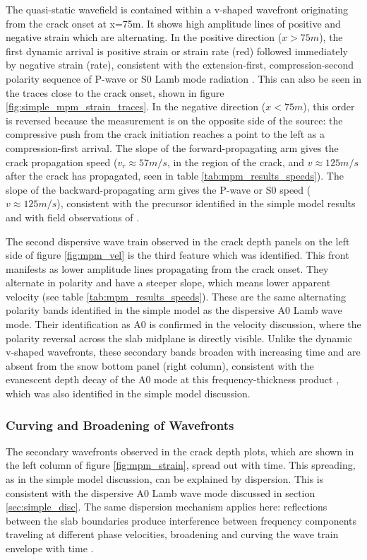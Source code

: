 The quasi-static wavefield is contained within a v-shaped wavefront originating from the crack onset at x=75m. It shows high amplitude lines of positive and negative strain which are alternating. In the positive
direction ($x > 75m$), the first dynamic arrival is positive strain or strain rate (red)
followed immediately by negative strain (rate), consistent with the
extension-first, compression-second polarity sequence of P-wave or S0 Lamb
mode radiation \parencite{kAkiRichards19801981}. This can also be seen in the traces close to the crack onset, shown in figure \ref{fig:simple_mpm_strain_traces}. In the negative direction
($x < 75m$), this order is reversed because the measurement is on the
opposite side of the source: the compressive push from the crack initiation
reaches a point to the left as a compression-first arrival. The slope
of the forward-propagating arm gives the crack propagation speed
($v_r \approx 57m/s$, in the region of the crack, and  $v \approx
125m/s$ after the crack has propagated, seen in table \ref{tab:mpm_results_speeds}). The slope of
the backward-propagating arm gives the P-wave or S0 speed ($v \approx
125m/s$), consistent with the precursor identified in the simple model
results and with field observations of \cite{herwijnenSeismicSensorArray2011}. \par

The second dispersive wave train observed in the crack depth panels on the left side of figure \ref{fig:mpm_vel} is the third feature which was identified. This front manifests as lower amplitude lines propagating from the crack onset. They alternate in polarity and have a steeper slope, which means lower apparent velocity (see table \ref{tab:mpm_results_speeds}). These are the same alternating polarity bands identified in the simple model as the dispersive A0 Lamb wave mode. Their identification as A0 is confirmed in the velocity discussion, where the polarity reversal across the slab midplane is directly visible. Unlike the dynamic v-shaped wavefronts, these secondary bands broaden with increasing time and are absent from the snow bottom panel (right column), consistent with the evanescent depth decay of the A0 mode at this frequency-thickness product \parencite{roseWavesPlates2014}, which was also identified in the simple model discussion. \par 

\subsubsection{Curving and Broadening of Wavefronts}
The secondary wavefronts observed in the crack depth plots, which are shown in the left column of figure \ref{fig:mpm_strain}, spread out with time. This spreading, as in the simple model discussion, can be explained by dispersion. This is consistent with the dispersive A0 Lamb wave mode discussed in section \ref{sec:simple_disc}. The same dispersion mechanism applies here: reflections between the slab boundaries produce interference between frequency components traveling at different phase velocities, broadening and curving the wave train envelope with time \parencite{graffWaveMotionElastic1975}. \par 


